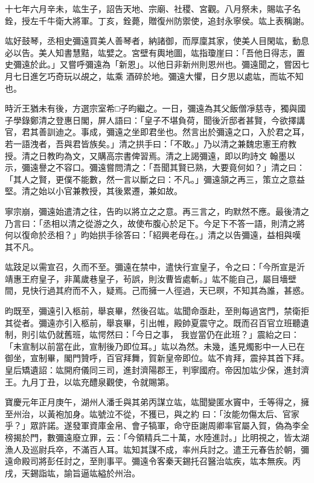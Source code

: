 \begin{pinyinscope}
 十七年六月辛未，竑生子，詔告天地、宗廟、社稷、宮觀。八月祭未，賜竑子名銓，授左千牛衛大將軍。丁亥，銓薨，贈復州防禦使，追封永寧侯。竑上表稱謝。



 竑好鼓琴，丞相史彌遠買美人善琴者，納諸御，而厚廩其家，使美人目閑竑，動息必以告。美人知書慧黠，竑嬖之。宮壁有輿地圖，竑指瓊崖曰：「吾他日得志，置史彌遠於此。」又嘗呼彌遠為「新恩」。以他日非新州則恩州也。彌遠聞之，嘗因七月七日進乞巧奇玩以覘之，竑乘
 酒碎於地。彌遠大懼，日夕思以處竑，而竑不知也。



 時沂王猶未有後，方選宗室希□子昀繼之。一日，彌遠為其父飯僧凈慈寺，獨與國子學錄鄭清之登惠日閣，屏人語曰：「皇子不堪負荷，聞後沂邸者甚賢，今欲擇講官，君其善訓迪之。事成，彌遠之坐即君坐也。然言出於彌遠之口，入於君之耳，若一語洩者，吾與君皆族矣。」清之拱手曰：「不敢。」乃以清之兼魏忠憲王府教授。清之日教昀為文，又購高宗書俾習焉。清之上謁彌遠，即以昀詩文
 翰墨以示，彌遠譽之不容口。彌遠嘗問清之：「吾聞其賢已熟，大要竟何如？」清之曰：「其人之賢，更僕不能數，然一言以斷之曰：不凡。」彌遠頷之再三，策立之意益堅。清之始以小官兼教授，其後累遷，兼如故。



 寧宗崩，彌遠始遣清之往，告昀以將立之之意。再三言之，昀默然不應。最後清之乃言曰：「丞相以清之從游之久，故使布腹心於足下。今足下不答一語，則清之將何以復命於丞相？」昀始拱手徐答曰：「紹興老母在。」清之以告彌遠，益相與嘆
 其不凡。



 竑跂足以需宣召，久而不至。彌遠在禁中，遣快行宣皇子，令之曰：「今所宣是沂靖惠王府皇子，非萬歲巷皇子，茍誤，則汝曹皆處斬。」竑不能自己，屬目墻壁間，見快行過其府而不入，疑焉。己而擁一人徑過，天已暝，不知其為誰，甚惑。



 昀既至，彌遠引入柩前，舉哀畢，然後召竑。竑聞命亟赴，至則每過宮門，禁衛拒其從者。彌遠亦引入柩前，舉哀畢，引出帷，殿帥夏震守之。既而召百官立班聽遺制，則引竑仍就舊班，竑愕然曰：「今日之事，
 我豈當仍在此班？」震紿之曰：「未宣制以前當在此，宣制後乃即位耳。」竑以為然。未幾，遙見燭影中一人已在御坐，宣制畢，閣門贊呼，百官拜舞，賀新皇帝即位。竑不肯拜，震捽其首下拜。皇后矯遺詔：竑開府儀同三司，進封濟陽郡王，判寧國府。帝因加竑少保，進封濟王。九月丁丑，以竑充醴泉觀使，令就賜第。



 寶慶元年正月庚午，湖州人潘壬與其弟丙謀立竑，竑聞變匿水竇中，壬等得之，擁至州治，以黃袍加身。竑號泣不從，不獲已，與之約
 曰：「汝能勿傷太后、官家乎？」眾許諾。遂發軍資庫金帛、會子犒軍，命守臣謝周卿率官屬入賀，偽為李全榜揭於門，數彌遠廢立罪，云：「今領精兵二十萬，水陸進討。」比明視之，皆太湖漁人及巡尉兵卒，不滿百人耳。竑知其謀不成，率州兵討之。遣王元春告於朝，彌遠命殿司將彭任討之，至則事平。彌遠令客秦天錫托召醫治竑疾，竑本無疾。丙戌，天錫詣竑，諭旨逼竑縊於州治。




\end{pinyinscope}
